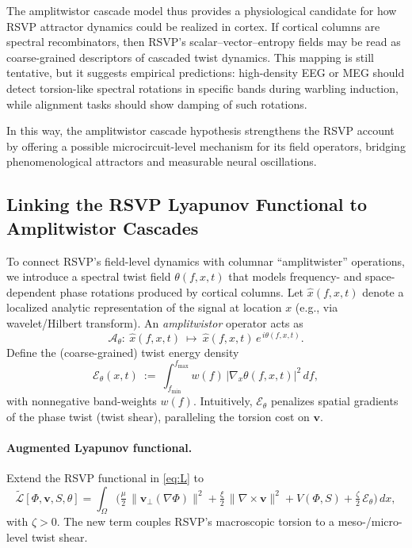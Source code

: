 \documentclass[a4paper,11pt]{article}
\begin{document}
The amplitwistor cascade model thus provides a physiological candidate for how
RSVP attractor dynamics could be realized in cortex. If cortical columns are
spectral recombinators, then RSVP’s scalar--vector--entropy fields may be read
as coarse-grained descriptors of cascaded twist dynamics. This mapping is still
tentative, but it suggests empirical predictions: high-density EEG or MEG
should detect torsion-like spectral rotations in specific bands during warbling
induction, while alignment tasks should show damping of such rotations.

In this way, the amplitwistor cascade hypothesis strengthens the RSVP account
by offering a possible microcircuit-level mechanism for its field operators,
bridging phenomenological attractors and measurable neural oscillations.

\subsection{Linking the RSVP Lyapunov Functional to Amplitwistor Cascades}
\label{sec:lyapunov-amplitwistor}

To connect RSVP’s field-level dynamics with columnar ``amplitwister'' operations,
we introduce a spectral twist field $\theta(f,x,t)$ that models frequency- and
space-dependent phase rotations produced by cortical columns. Let
$\widehat{x}(f,x,t)$ denote a localized analytic representation of the signal at
location $x$ (e.g., via wavelet/Hilbert transform). An \emph{amplitwistor}
operator acts as
\[
\mathcal{A}_\theta:\ \widehat{x}(f,x,t)\ \mapsto\ \widehat{x}(f,x,t)\,e^{\,i\theta(f,x,t)}.
\]
Define the (coarse-grained) twist energy density
\[
\mathcal{E}_\theta(x,t)\ :=\ \int_{f_{\min}}^{f_{\max}} w(f)\,\big|\nabla_x \theta(f,x,t)\big|^2\,df,
\]
with nonnegative band-weights $w(f)$. Intuitively, $\mathcal{E}_\theta$ penalizes
spatial gradients of the phase twist (twist shear), paralleling the torsion
cost on $\mathbf{v}$.

\paragraph{Augmented Lyapunov functional.}
Extend the RSVP functional in \eqref{eq:L} to
\[
\widetilde{\mathcal{L}}[\Phi,\mathbf{v},S,\theta]
=\int_\Omega \Big(
\tfrac{\mu}{2}\,\|\mathbf{v}_\perp(\nabla\Phi)\|^2
+\tfrac{\xi}{2}\,\|\nabla\times \mathbf{v}\|^2
+V(\Phi,S)
+\tfrac{\zeta}{2}\,\mathcal{E}_\theta
\Big)\,dx,
\]
with $\zeta>0$. The new term couples RSVP’s macroscopic torsion to a meso-/micro-
level twist shear.
\end{document}
